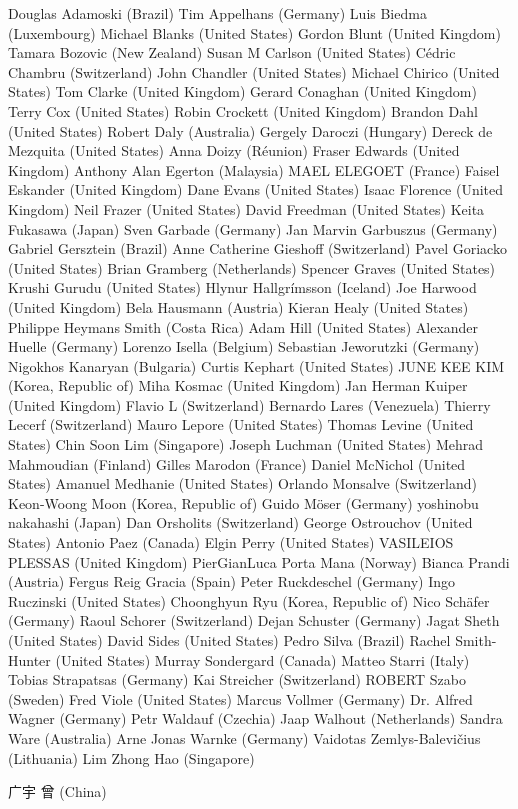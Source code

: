 Douglas Adamoski (Brazil)
Tim Appelhans (Germany)
Luis Biedma (Luxembourg)
Michael Blanks (United States)
Gordon Blunt (United Kingdom)
Tamara Bozovic (New Zealand)
Susan M Carlson (United States)
Cédric Chambru (Switzerland)
John Chandler (United States)
Michael Chirico (United States)
Tom Clarke (United Kingdom)
Gerard Conaghan (United Kingdom)
Terry Cox (United States)
Robin Crockett (United Kingdom)
Brandon Dahl (United States)
Robert Daly (Australia)
Gergely Daroczi (Hungary)
Dereck de Mezquita (United States)
Anna Doizy (Réunion)
Fraser Edwards (United Kingdom)
Anthony Alan Egerton (Malaysia)
MAEL ELEGOET (France)
Faisel Eskander (United Kingdom)
Dane Evans (United States)
Isaac Florence (United Kingdom)
Neil Frazer (United States)
David Freedman (United States)
Keita Fukasawa (Japan)
Sven Garbade (Germany)
Jan Marvin Garbuszus (Germany)
Gabriel Gersztein (Brazil)
Anne Catherine Gieshoff (Switzerland)
Pavel Goriacko (United States)
Brian Gramberg (Netherlands)
Spencer Graves (United States)
Krushi Gurudu (United States)
Hlynur Hallgrímsson (Iceland)
Joe Harwood (United Kingdom)
Bela Hausmann (Austria)
Kieran Healy (United States)
Philippe Heymans Smith (Costa Rica)
Adam Hill (United States)
Alexander Huelle (Germany)
Lorenzo Isella (Belgium)
Sebastian Jeworutzki (Germany)
Nigokhos Kanaryan (Bulgaria)
Curtis Kephart (United States)
JUNE KEE KIM (Korea, Republic of)
Miha Kosmac (United Kingdom)
Jan Herman Kuiper (United Kingdom)
Flavio L (Switzerland)
Bernardo Lares (Venezuela)
Thierry Lecerf (Switzerland)
Mauro Lepore (United States)
Thomas Levine (United States)
Chin Soon Lim (Singapore)
Joseph Luchman (United States)
Mehrad Mahmoudian (Finland)
Gilles Marodon (France)
Daniel McNichol (United States)
Amanuel Medhanie (United States)
Orlando Monsalve (Switzerland)
Keon-Woong Moon (Korea, Republic of)
Guido Möser (Germany)
yoshinobu nakahashi (Japan)
Dan Orsholits (Switzerland)
George Ostrouchov (United States)
Antonio Paez (Canada)
Elgin Perry (United States)
VASILEIOS PLESSAS (United Kingdom)
PierGianLuca Porta Mana (Norway)
Bianca Prandi (Austria)
Fergus Reig Gracia (Spain)
Peter Ruckdeschel (Germany)
Ingo Ruczinski (United States)
Choonghyun Ryu (Korea, Republic of)
Nico Schäfer (Germany)
Raoul Schorer (Switzerland)
Dejan Schuster (Germany)
Jagat Sheth (United States)
David Sides (United States)
Pedro Silva (Brazil)
Rachel Smith-Hunter (United States)
Murray Sondergard (Canada)
Matteo Starri (Italy)
Tobias Strapatsas (Germany)
Kai Streicher (Switzerland)
ROBERT Szabo (Sweden)
Fred Viole (United States)
Marcus Vollmer (Germany)
Dr. Alfred Wagner (Germany)
Petr Waldauf (Czechia)
Jaap Walhout (Netherlands)
Sandra Ware (Australia)
Arne Jonas Warnke (Germany)
Vaidotas Zemlys-Balevičius (Lithuania)
Lim Zhong Hao (Singapore)
\begin{CJK*}{UTF8}{gbsn} 
广宇 曾 (China) \end{CJK*}


\address{Torsten Hothorn \\
  Universit\"at Z\"urich, Switzerland}
